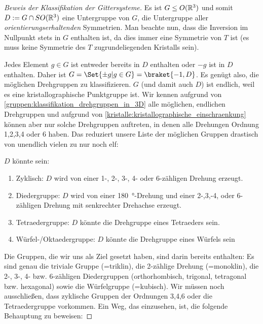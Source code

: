 \begin{proof}[Beweis der Klassifikation der Gittersysteme]
Es ist $G\leq O(\mathbb{R}^3)$ und somit $D:=G\cap SO(\mathbb{R}^3)$ eine Untergruppe von $G$, die Untergruppe aller \emph{orientierungserhaltenden} Symmetrien. Man beachte nun, dass die Inversion im Nullpunkt stets in $G$ enthalten ist, da dies immer eine Symmetrie von $T$ ist (es muss keine Symmetrie des $T$ zugrundeliegenden Kristalls sein).

Jedes Element $g\in G$ ist entweder bereits in $D$ enthalten oder $-g$ ist in $D$ enthalten. Daher ist $G=\Set{\pm g | g\in G} = \braket{-1,D}$. Es genügt also, die möglichen Drehgruppen zu klassifizieren. $G$ (und damit auch $D$) ist endlich, weil es eine kristallographische Punktgruppe ist. Wir kennen aufgrund von \ref{gruppen:klassifikation_drehgruppen_in_3D} alle möglichen, endlichen Drehgruppen und aufgrund von \ref{kristalle:kristallographische_einschraenkung} können aber nur solche Drehgruppen auftreten, in denen alle Drehungen Ordnung 1,2,3,4 oder 6 haben. Das reduziert unsere Liste der möglichen Gruppen drastisch von unendlich vielen zu nur noch elf:

$D$ könnte sein:
\begin{enumerate}
\item Zyklisch: $D$ wird von einer 1-, 2-, 3-, 4- oder 6-zähligen Drehung erzeugt.
\item Diedergruppe: $D$ wird von einer \SI{180}{\degree}-Drehung und einer 2-,3,-4, oder 6-zähligen Drehung mit senkrechter Drehachse erzeugt.
\item Tetraedergruppe: $D$ könnte die Drehgruppe eines Tetraeders sein.
\item Würfel-/Oktaedergruppe: $D$ könnte die Drehgruppe eines Würfels sein
\end{enumerate}

Die Gruppen, die wir uns als Ziel gesetzt haben, sind darin bereits enthalten: Es sind genau die triviale Gruppe (=triklin), die 2-zählige Drehung (=monoklin), die 2-, 3-, 4- bzw. 6-zähligen Diedergruppen (orthorhombisch, trigonal, tetragonal bzw. hexagonal) sowie die Würfelgruppe (=kubisch). Wir müssen noch ausschließen, dass zyklische Gruppen der Ordnungen 3,4,6 oder die Tetraedergruppe vorkommen. Ein Weg, das einzusehen, ist, die folgende Behauptung zu beweisen:

\medbreak
{}


\end{proof}
